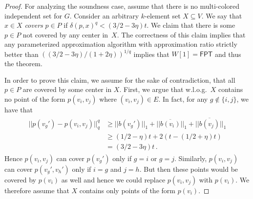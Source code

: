 \documentclass[11pt]{article}
\newcommand{\fpt}{\textsf{FPT}\xspace}
\begin{document}
\begin{proof}
For analyzing the soundness case,  assume that there is no multi-colored independent set for $G$. Consider an arbitrary $k$-element set $X\subseteq V$. We say that $x\in X$ \emph{covers} $p\in P$ if $\delta(p,x)^q < (3/2-3\eta)t$. We claim that there is some~$p\in P$ not covered by any center in~$X$. The correctness of this claim implies that any parameterized approximation algorithm with approximation ratio strictly better than $((3/2-3\eta)/(1+2\eta))^{1/q}$ implies that $W[1]=\fpt$ and thus the theorem.

In order to prove this claim, we assume for the sake of contradiction, that all $p\in P$ are covered by some center in $X$. First, we argue that w.l.o.g.\ $X$ contains no point of the form $p(v_i,v_j)$ where $(v_i,v_j)\in E$. In fact, for any $g\notin\{i,j\}$, we have that
\begin{align}\label{eq:vert-edge-code}
\begin{split}
 ||p(v_g')-p(v_i,v_j)||_q^q &\geq
 ||b(v_g')||_1+||\overline{b(v_i)}||_1+||\overline{b(v_j)}||_1\\
 & \geq (1/2-\eta)t+2(t-(1/2+\eta)t)\\
 & = (3/2-3\eta)t\,.
 \end{split}
\end{align}
Hence $p(v_i,v_j)$ can cover $p(v_g')$ only if $g=i$ or $g=j$. Similarly, $p(v_i,v_j)$ can cover $p(v_g',v_h')$ only if $i=g$ and $j=h$. But then these points would be covered by $p(v_i)$ as well and hence we could replace $p(v_i,v_j)$ with $p(v_i)$. We therefore assume that $X$ contains only points of the form $p(v_i)$.


\end{proof}
\end{document}
